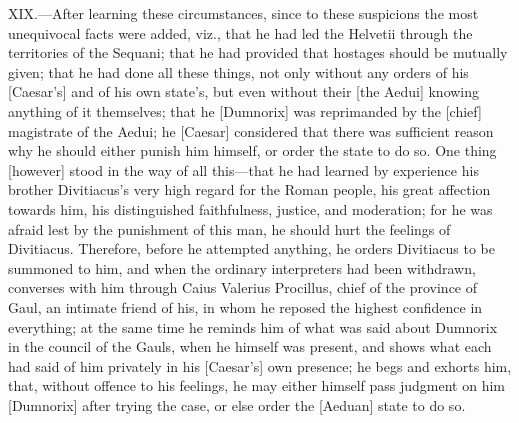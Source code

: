 XIX.—After learning these circumstances, since to these suspicions the
most unequivocal facts were added, viz., that he had led the Helvetii
through the territories of the Sequani; that he had provided that
hostages should be mutually given; that he had done all these things,
not only without any orders of his [Caesar's] and of his own state's,
but even without their [the Aedui] knowing anything of it themselves;
that he [Dumnorix] was reprimanded by the [chief] magistrate of the
Aedui; he [Caesar] considered that there was sufficient reason why he
should either punish him himself, or order the state to do so. One thing
[however] stood in the way of all this—that he had learned by
experience his brother Divitiacus's very high regard for the Roman
people, his great affection towards him, his distinguished faithfulness,
justice, and moderation; for he was afraid lest by the punishment of
this man, he should hurt the feelings of Divitiacus. Therefore, before
he attempted anything, he orders Divitiacus to be summoned to him, and
when the ordinary interpreters had been withdrawn, converses with him
through Caius Valerius Procillus, chief of the province of Gaul, an
intimate friend of his, in whom he reposed the highest confidence in
everything; at the same time he reminds him of what was said about
Dumnorix in the council of the Gauls, when he himself was present, and
shows what each had said of him privately in his [Caesar's] own
presence; he begs and exhorts him, that, without offence to his
feelings, he may either himself pass judgment on him [Dumnorix] after
trying the case, or else order the [Aeduan] state to do so.

